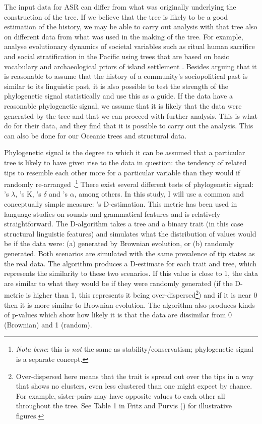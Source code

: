 \documentclass[12pt,letterpaper]{article}
\begin{document}
The input data for ASR can differ from what was originally underlying the construction of the tree. If we believe that the tree is likely to be a good estimation of the history, we may be able to carry out analysis with that tree also on different data from what was used in the making of the tree. For example, \citet{watts2016ritual} analyse evolutionary dynamics of societal variables such as ritual human sacrifice and social stratification in the Pacific using trees that are based on basic vocabulary and archaeological priors of island settlement \citep{grayetal_2009}. Besides arguing that it is reasonable to assume that the history of a community's sociopolitical past is similar to its linguistic past, it is also possible to test the strength of the phylogenetic signal statistically and use this as a guide. If the data have a reasonable phylogenetic signal, we assume that it is likely that the data were generated by the tree and that we can proceed with further analysis. This is what \citet{watts2016ritual} do for their data, and they find that it is possible to carry out the analysis. This can also be done for our Oceanic trees and structural data.

Phylogenetic signal is the degree to which it can be assumed that a particular tree is likely to have given rise to the data in question: the tendency of related tips to resemble each other more for a particular variable than they would if randomly re-arranged \citep[905]{blomberg2002tempo}.\footnote{\textit{Nota bene}: this is \textit{not} the same as stability/conservatism; phylogenetic signal is a separate concept.} There exist several different tests of phylogenetic signal: \citet{pagel1999inferring}'s $\lambda$, \citet{blomberg2003testing}'s K, \citet{borges2019measuring}'s $\delta$ and \citet{ives2010phylogenetic}'s $\alpha$, among others. In this study, I will use a common and conceptually simple measure: \citet{fritz2010selectivity}'s D-estimation. This metric has been used in language studies on sounds \citep{macklin2021phylogenetic} and grammatical features \citep{hubler2022phylogenetic} and is relatively straightforward. The D-algorithm takes a tree and a binary trait (in this case structural linguistic features) and simulates what the distribution of values would be if the data were: (a) generated by Brownian evolution, or (b) randomly generated. Both scenarios are simulated with the same prevalence of tip states as the real data. The algorithm produces a D-estimate for each trait and tree, which represents the similarity to these two scenarios. If this value is close to 1, the data are similar to what they would be if they were randomly generated (if the D-metric is higher than 1, this represents it being over-dispersed\footnote{Over-dispersed here means that the trait is spread out over the tips in a way that shows no clusters, even less clustered than one might expect by chance. For example, sister-pairs may have opposite values to each other all throughout the tree. See Table 1 in Fritz and Purvis (\citeyear[1044]{fritz2010selectivity}) for illustrative figures.}) and if it is near 0 then it is more similar to Brownian evolution. The algorithm also produces kinds of p-values which show how likely it is that the data are dissimilar from 0 (Brownian) and 1 (random).
\end{document}
